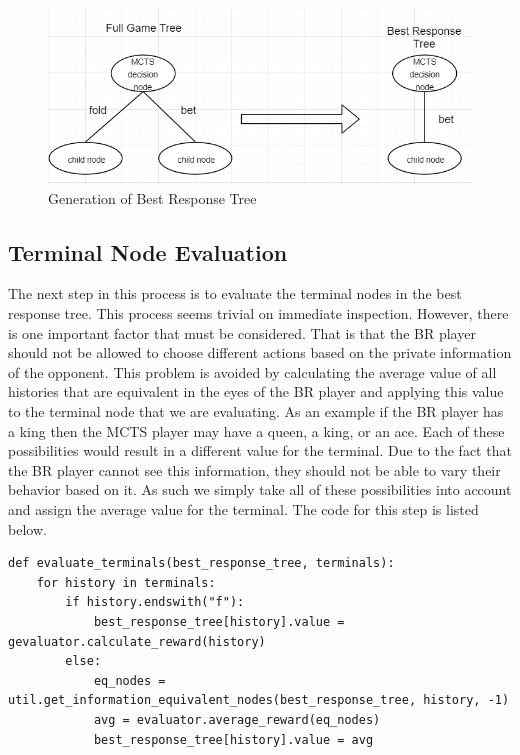 \begin{figure}
    \includegraphics[scale=1]{images/best_response_tree_vs_full_tree.PNG}
    \caption{Generation of Best Response Tree}
\end{figure}

\subsection{Terminal Node Evaluation}\label{subsec:terminalNodeEvaluation}
The next step in this process is to evaluate the terminal nodes in the best response tree.
This process seems trivial on immediate inspection.
However, there is one important factor that must be considered.
That is that the BR player should not be allowed to choose different actions based on the
private information of the opponent.
This problem is avoided by calculating the average value of all histories that are equivalent in
the eyes of the BR player and applying this value to the terminal node that we are evaluating.
As an example if the BR player has a king then the MCTS player may have a queen, a king, or an ace.
Each of these possibilities would result in a different value for the terminal.
Due to the fact that the BR player cannot see this information, they should not be able to vary
their behavior based on it.
As such we simply take all of these possibilities into account and assign the average value for
the terminal.
The code for this step is listed below.

\begin{lstlisting}[style=Python]
def evaluate_terminals(best_response_tree, terminals):
    for history in terminals:
        if history.endswith("f"):
            best_response_tree[history].value = gevaluator.calculate_reward(history)
        else:
            eq_nodes = util.get_information_equivalent_nodes(best_response_tree, history, -1)
            avg = evaluator.average_reward(eq_nodes)
            best_response_tree[history].value = avg
\end{lstlisting}

